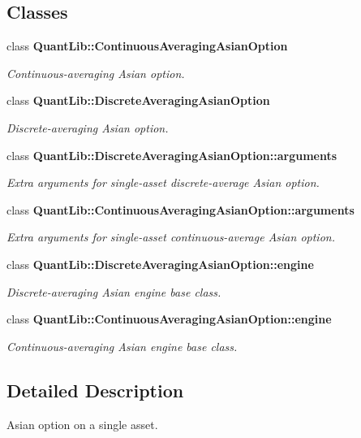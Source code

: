 \subsection*{Classes}
\begin{DoxyCompactItemize}
\item 
class {\bf Quant\+Lib\+::\+Continuous\+Averaging\+Asian\+Option}
\begin{DoxyCompactList}\small\item\em Continuous-\/averaging Asian option. \end{DoxyCompactList}\item 
class {\bf Quant\+Lib\+::\+Discrete\+Averaging\+Asian\+Option}
\begin{DoxyCompactList}\small\item\em Discrete-\/averaging Asian option. \end{DoxyCompactList}\item 
class {\bf Quant\+Lib\+::\+Discrete\+Averaging\+Asian\+Option\+::arguments}
\begin{DoxyCompactList}\small\item\em Extra arguments for single-\/asset discrete-\/average Asian option. \end{DoxyCompactList}\item 
class {\bf Quant\+Lib\+::\+Continuous\+Averaging\+Asian\+Option\+::arguments}
\begin{DoxyCompactList}\small\item\em Extra arguments for single-\/asset continuous-\/average Asian option. \end{DoxyCompactList}\item 
class {\bf Quant\+Lib\+::\+Discrete\+Averaging\+Asian\+Option\+::engine}
\begin{DoxyCompactList}\small\item\em Discrete-\/averaging Asian engine base class. \end{DoxyCompactList}\item 
class {\bf Quant\+Lib\+::\+Continuous\+Averaging\+Asian\+Option\+::engine}
\begin{DoxyCompactList}\small\item\em Continuous-\/averaging Asian engine base class. \end{DoxyCompactList}\end{DoxyCompactItemize}


\subsection{Detailed Description}
Asian option on a single asset. 

